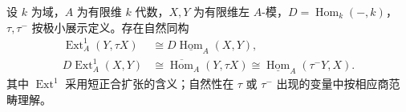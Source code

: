 \begin{theorem}\label{b5:thm:auslander-reiten-formula}
	设 \(k\) 为域，\(A\) 为有限维 \(k\) 代数，\(X,Y\) 为有限维左 \(A\)-模，\(D=\operatorname{Hom}_k(-,k)\)，\(\tau,\tau^-\) 按极小展示定义。存在自然同构
	\begin{align}
		\operatorname{Ext}_A^1(Y,\tau X)
		&\cong D\underline{\operatorname{Hom}}_A(X,Y),
		\label{b5:eq:ar-stable-duality}\\
		D\operatorname{Ext}_A^1(X,Y)
		&\cong\overline{\operatorname{Hom}}_A(Y,\tau X)
		\cong\underline{\operatorname{Hom}}_A(\tau^-Y,X).
		\label{b5:eq:ar-formula}
	\end{align}
	其中 \(\operatorname{Ext}^1\) 采用短正合扩张的含义；自然性在 \(\tau\) 或 \(\tau^-\) 出现的变量中按相应商范畴理解。
\end{theorem}
